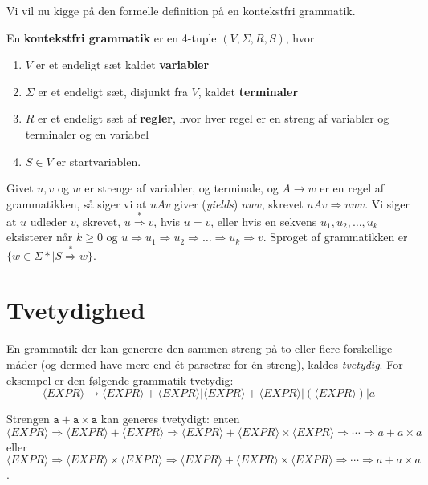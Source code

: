 Vi vil nu kigge på den formelle definition på en kontekstfri grammatik.

\begin{definition}
  En \textbf{kontekstfri grammatik}   er en 4-tuple $(V, \Sigma, R, S)$, hvor
  \begin{enumerate}
    \item $V$ er et endeligt sæt kaldet \textbf{variabler}
    \item $\Sigma$ er et endeligt sæt, disjunkt fra $V$, kaldet \textbf{terminaler}
    \item $R$ er et endeligt sæt af \textbf{regler}, hvor hver regel er en streng af variabler og terminaler og en variabel
    \item $S \in V$ er startvariablen.
  \end{enumerate}

\end{definition}

Givet $u, v$ og $w$ er strenge af variabler, og terminale, og $A \rightarrow w$ er en regel af grammatikken, så siger vi at $uAv$ giver (\textit{yields}) $uwv$, skrevet $uAv \Rightarrow uwv$. Vi siger at $u$ udleder $v$, skrevet, $u \stackrel{*}{\Rightarrow} v$, hvis $u = v$, eller hvis en sekvens $u_{1}, u_{2}, \ldots, u_{k}$ eksisterer når $k \geq 0$ og $u \Rightarrow u_{1} \Rightarrow u_{2} \Rightarrow \ldots \Rightarrow u_{k} \Rightarrow v$. Sproget af grammatikken er $\{w \in \Sigma* | S \stackrel{*}{\Rightarrow} w\}$.

\newpage
\section{Tvetydighed}%
\label{sec:tvetydighed}

En grammatik der kan generere den sammen streng på to eller flere forskellige måder (og dermed have mere end ét parsetræ for én streng), kaldes \textit{tvetydig}. For eksempel er den følgende grammatik tvetydig:
\[
\langle EXPR \rangle \rightarrow \langle EXPR \rangle + \langle EXPR \rangle | \langle EXPR \rangle + \langle EXPR \rangle | ( \langle EXPR \rangle ) | a
\]

Strengen $\mathtt{a + a \times a}$ kan generes tvetydigt: enten $$\langle EXPR \rangle \Rightarrow \langle EXPR \rangle + \langle EXPR \rangle \Rightarrow \langle EXPR \rangle + \langle EXPR \rangle \times \langle EXPR \rangle \Rightarrow \cdots \Rightarrow a + a \times a$$ eller $$\langle EXPR \rangle \Rightarrow \langle EXPR \rangle \times \langle EXPR \rangle \Rightarrow \langle EXPR \rangle + \langle EXPR \rangle \times \langle EXPR \rangle \Rightarrow \cdots \Rightarrow a + a \times a$$.

